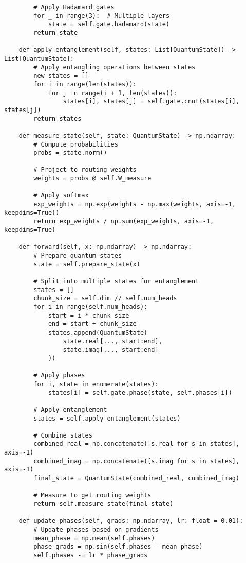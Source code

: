 \documentclass[10pt]{article}
\begin{document}
\begin{verbatim}
        # Apply Hadamard gates
        for _ in range(3):  # Multiple layers
            state = self.gate.hadamard(state)
        return state
    
    def apply_entanglement(self, states: List[QuantumState]) -> List[QuantumState]:
        # Apply entangling operations between states
        new_states = []
        for i in range(len(states)):
            for j in range(i + 1, len(states)):
                states[i], states[j] = self.gate.cnot(states[i], states[j])
        return states
    
    def measure_state(self, state: QuantumState) -> np.ndarray:
        # Compute probabilities
        probs = state.norm()
        
        # Project to routing weights
        weights = probs @ self.W_measure
        
        # Apply softmax
        exp_weights = np.exp(weights - np.max(weights, axis=-1, keepdims=True))
        return exp_weights / np.sum(exp_weights, axis=-1, keepdims=True)
    
    def forward(self, x: np.ndarray) -> np.ndarray:
        # Prepare quantum states
        state = self.prepare_state(x)
        
        # Split into multiple states for entanglement
        states = []
        chunk_size = self.dim // self.num_heads
        for i in range(self.num_heads):
            start = i * chunk_size
            end = start + chunk_size
            states.append(QuantumState(
                state.real[..., start:end],
                state.imag[..., start:end]
            ))
        
        # Apply phases
        for i, state in enumerate(states):
            states[i] = self.gate.phase(state, self.phases[i])
        
        # Apply entanglement
        states = self.apply_entanglement(states)
        
        # Combine states
        combined_real = np.concatenate([s.real for s in states], axis=-1)
        combined_imag = np.concatenate([s.imag for s in states], axis=-1)
        final_state = QuantumState(combined_real, combined_imag)
        
        # Measure to get routing weights
        return self.measure_state(final_state)
    
    def update_phases(self, grads: np.ndarray, lr: float = 0.01):
        # Update phases based on gradients
        mean_phase = np.mean(self.phases)
        phase_grads = np.sin(self.phases - mean_phase)
        self.phases -= lr * phase_grads


\end{verbatim}
\end{document}
